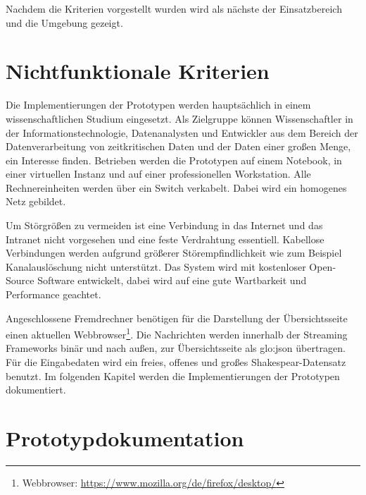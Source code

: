 Nachdem die Kriterien vorgestellt wurden wird als nächste der Einsatzbereich und die Umgebung gezeigt.

\section{Nichtfunktionale Kriterien}
\label{sec:einsatzUmgebung}

Die Implementierungen der Prototypen werden hauptsächlich in einem wissenschaftlichen Studium eingesetzt. Als Zielgruppe können Wissenschaftler in der Informationstechnologie, Datenanalysten und Entwickler aus dem Bereich der Datenverarbeitung von zeitkritischen Daten und der Daten einer großen Menge, ein Interesse finden. Betrieben werden die Prototypen auf einem Notebook, in einer virtuellen Instanz und auf einer professionellen Workstation. Alle Rechnereinheiten werden über ein Switch verkabelt. Dabei wird ein homogenes Netz gebildet. 

Um Störgrößen zu vermeiden ist eine Verbindung in das Internet und das Intranet nicht vorgesehen und eine feste Verdrahtung essentiell. Kabellose Verbindungen werden aufgrund größerer Störempfindlichkeit wie zum Beispiel Kanalauslöschung nicht unterstützt. Das System wird mit kostenloser Open-Source Software entwickelt, dabei wird auf eine gute Wartbarkeit und Performance geachtet.

Angeschlossene Fremdrechner benötigen für die Darstellung der Übersichtsseite einen aktuellen Webbrowser\footnote{Webbrowser: \url{https://www.mozilla.org/de/firefox/desktop/}}. Die Nachrichten werden innerhalb der Streaming Frameworks binär und nach außen, zur Übersichtsseite als \gls{glo:json} übertragen. Für die Eingabedaten wird ein freies, offenes und großes Shakespear-Datensatz  benutzt. Im folgenden Kapitel werden die Implementierungen der Prototypen dokumentiert.




\section{Prototypdokumentation}
\label{sec:prototypeDocumentation}